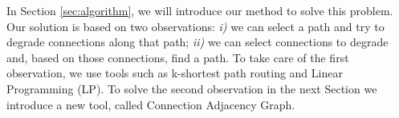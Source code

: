 \documentclass[journal]{IEEEtran}
\newtheorem{lemma}[]{Lemma}
\begin{document}
In Section \ref{sec:algorithm}, we will introduce our method to solve this problem. Our solution is based on two observations: \textit{i)} we can select a path and try to degrade connections along that path; \textit{ii)} we can select connections to degrade and, based on those connections, find a path. To take care of the first observation, we use tools such as k-shortest path routing and Linear Programming (LP). To solve the second observation in the next Section we introduce a new tool, called Connection Adjacency Graph.






\end{document}
